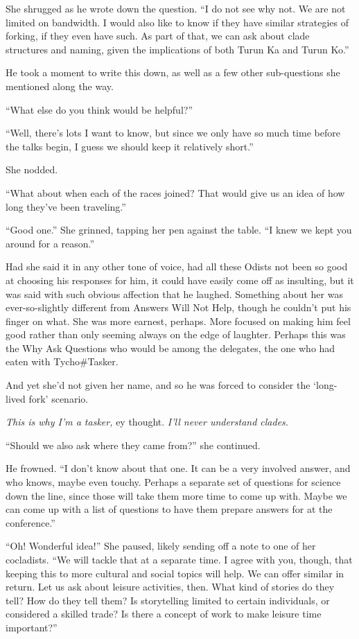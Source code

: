 She shrugged as he wrote down the question. ``I do not see why not. We are not limited on bandwidth. I would also like to know if they have similar strategies of forking, if they even have such. As part of that, we can ask about clade structures and naming, given the implications of both Turun Ka and Turun Ko.''

He took a moment to write this down, as well as a few other sub-questions she mentioned along the way.

``What else do you think would be helpful?''

``Well, there's lots I want to know, but since we only have so much time before the talks begin, I guess we should keep it relatively short.''

She nodded.

``What about when each of the races joined? That would give us an idea of how long they've been traveling.''

``Good one.'' She grinned, tapping her pen against the table. ``I knew we kept you around for a reason.''

Had she said it in any other tone of voice, had all these Odists not been so good at choosing his responses for him, it could have easily come off as insulting, but it was said with such obvious affection that he laughed. Something about her was ever-so-slightly different from Answers Will Not Help, though he couldn't put his finger on what. She was more earnest, perhaps. More focused on making him feel good rather than only seeming always on the edge of laughter. Perhaps this was the Why Ask Questions who would be among the delegates, the one who had eaten with Tycho\#Tasker.

And yet she'd not given her name, and so he was forced to consider the `long-lived fork' scenario.

\emph{This is why I'm a tasker,} ey thought. \emph{I'll never understand clades.}

``Should we also ask where they came from?'' she continued.

He frowned. ``I don't know about that one. It can be a very involved answer, and who knows, maybe even touchy. Perhaps a separate set of questions for science down the line, since those will take them more time to come up with. Maybe we can come up with a list of questions to have them prepare answers for at the conference.''

``Oh! Wonderful idea!'' She paused, likely sending off a note to one of her cocladists. ``We will tackle that at a separate time. I agree with you, though, that keeping this to more cultural and social topics will help. We can offer similar in return. Let us ask about leisure activities, then. What kind of stories do they tell? How do they tell them? Is storytelling limited to certain individuals, or considered a skilled trade? Is there a concept of work to make leisure time important?''

